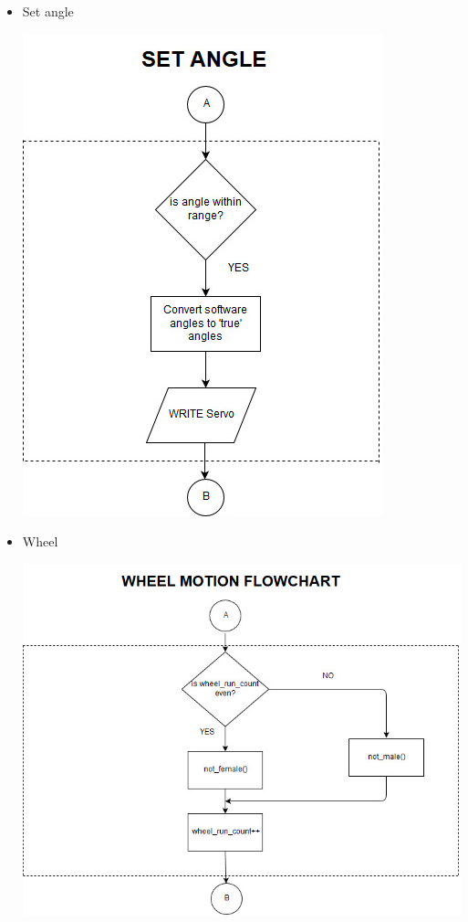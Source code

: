 \documentclass[a4paper,12pt,oneside]{book}
\begin{document}
\begin{itemize}
\item Set angle \\

\vspace{-20pt}
\begin{center}
 \includegraphics[scale=0.5]{set_angle_flow2.jpg}
\end{center}


\item Wheel \\
\vspace{-20pt}
\begin{center}
 \includegraphics[scale=0.4]{wheel_flow2.jpg}
\end{center}




\end{itemize}
\end{document}
